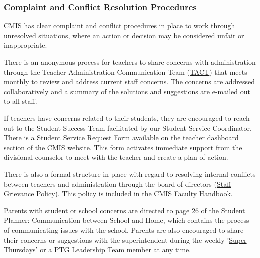 \subsubsection{Complaint and Conflict Resolution Procedures}



\begin{findings}
CMIS has clear complaint and conflict procedures in place to work through unresolved situations, where an action or decision may be considered unfair or inappropriate.  

There is an anonymous process for teachers to share concerns with administration through the Teacher Administration Communication Team (\href{https://docs.google.com/a/cmis.ac.th/document/d/14nhwcw8xo3i-23Q-WUxo6KJ_c8yFKu-jTdCctt4MFcs/edit?usp=sharing}{TACT}) that meets monthly to review and address current staff concerns. The concerns are addressed collaboratively and a \href{https://docs.google.com/a/cmis.ac.th/document/d/1KLB4c5_LkxXzq4vP2EuNhBVPp2q_FT9qy1cBBwaS5JM/edit?usp=sharing}{summary} of the solutions and suggestions are e-mailed out to all staff.

If teachers have concerns related to their students, they are encouraged to reach out to the Student Success Team facilitated by our Student Service Coordinator.  There is a \href{https://docs.google.com/a/cmis.ac.th/forms/d/e/1FAIpQLScVtFtaEXarGOjwsiJyGdbLAMbeNzG9m44i1fWXFLbtMKZcUg/viewform}{Student Service Request Form} available on the teacher dashboard section of the CMIS website. This form activates immediate support from the divisional counselor to meet with the teacher and create a plan of action.

There is also a formal structure in place with regard to resolving internal conflicts between teachers and administration through the board of directors (\href{https://docs.google.com/a/cmis.ac.th/document/d/1RRBuWgqIb-BlwD8vTRrTG0u_FCHgQFD_oEbvseNdAPc/edit?usp=sharing}{Staff Grievance Policy}). This policy is included in the \href{https://docs.google.com/document/d/1fNreQp5yTOg_g9K4UnR8xvyQf-GcFOHo-6Onp4SqlKg/edit}{CMIS Faculty Handbook}.

Parents with student or school concerns are directed to page 26 of the Student Planner: Communication between School and Home, which contains the process of communicating issues with the school.
Parents are also encouraged to share their concerns or suggestions with the superintendent during the weekly '\href{http://blogs.cmis.ac.th/newsletter/2016/09/05/super-thursdays-starts-this-week/}{Super Thursdays}' or a \href{http://blogs.cmis.ac.th/ptg/about/}{PTG Leadership Team} member at any time. 


\end{findings}
